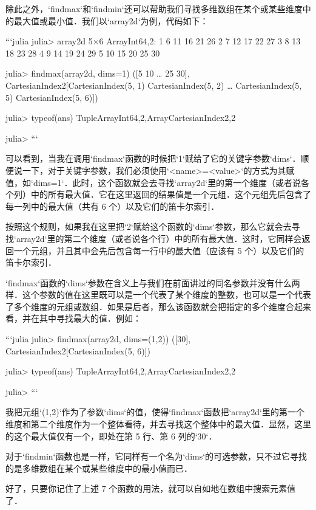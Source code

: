 除此之外，`findmax`和`findmin`还可以帮助我们寻找多维数组在某个或某些维度中的最大值或最小值．我们以`array2d`为例，代码如下：

```julia
julia> array2d
5×6 Array{Int64,2}:
 1   6  11  16  21  26
 2   7  12  17  22  27
 3   8  13  18  23  28
 4   9  14  19  24  29
 5  10  15  20  25  30

julia> findmax(array2d, dims=1)
([5 10 … 25 30], CartesianIndex{2}[CartesianIndex(5, 1) CartesianIndex(5, 2) … CartesianIndex(5, 5) CartesianIndex(5, 6)])

julia> typeof(ans)
Tuple{Array{Int64,2},Array{CartesianIndex{2},2}}

julia> 
```

可以看到，当我在调用`findmax`函数的时候把`1`赋给了它的关键字参数`dims`．顺便说一下，对于关键字参数，我们必须使用`<name>=<value>`的方式为其赋值，如`dims=1`．此时，这个函数就会去寻找`array2d`里的第一个维度（或者说各个列）中的所有最大值．它在这里返回的结果值是一个元组．这个元组先后包含了每一列中的最大值（共有 6 个）以及它们的笛卡尔索引．

按照这个规则，如果我在这里把`2`赋给这个函数的`dims`参数，那么它就会去寻找`array2d`里的第二个维度（或者说各个行）中的所有最大值．这时，它同样会返回一个元组，并且其中会先后包含每一行中的最大值（应该有 5 个）以及它们的笛卡尔索引．

`findmax`函数的`dims`参数在含义上与我们在前面讲过的同名参数并没有什么两样．这个参数的值在这里既可以是一个代表了某个维度的整数，也可以是一个代表了多个维度的元组或数组．如果是后者，那么该函数就会把指定的多个维度合起来看，并在其中寻找最大的值．例如：

```julia
julia> findmax(array2d, dims=(1,2))
([30], CartesianIndex{2}[CartesianIndex(5, 6)])

julia> typeof(ans)
Tuple{Array{Int64,2},Array{CartesianIndex{2},2}}

julia> 
```

我把元组`(1,2)`作为了参数`dims`的值，使得`findmax`函数把`array2d`里的第一个维度和第二个维度作为一个整体看待，并去寻找这个整体中的最大值．显然，这里的这个最大值仅有一个，即处在第 5 行、第 6 列的`30`．

对于`findmin`函数也是一样，它同样有一个名为`dims`的可选参数，只不过它寻找的是多维数组在某个或某些维度中的最小值而已．

好了，只要你记住了上述 7 个函数的用法，就可以自如地在数组中搜索元素值了．
